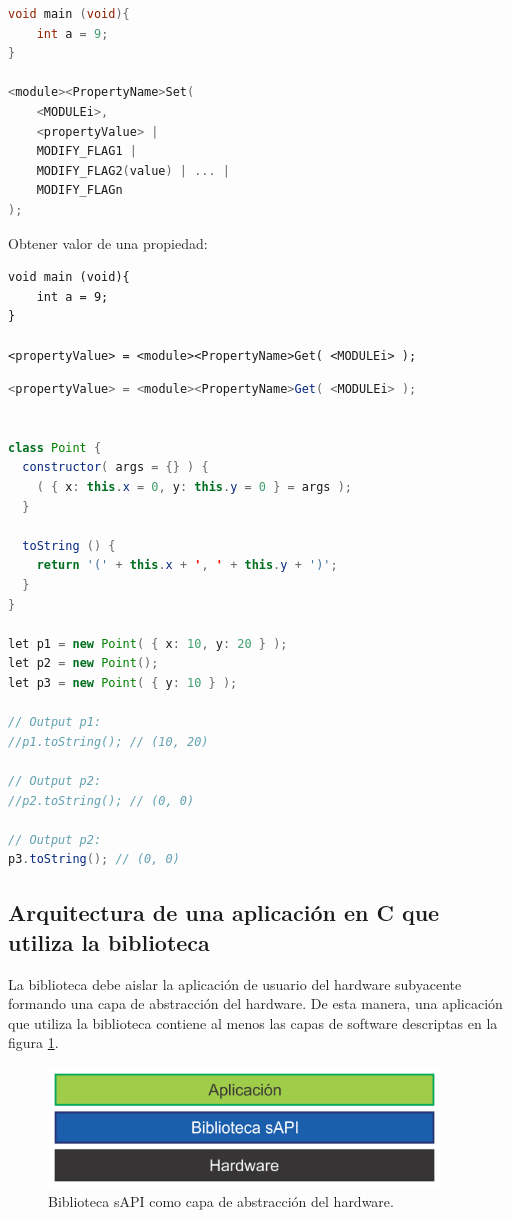 \begin{lstlisting}[language=C]
void main (void){
	int a = 9;
}

<module><PropertyName>Set(
    <MODULEi>,
    <propertyValue> |
    MODIFY_FLAG1 |
    MODIFY_FLAG2(value) | ... | 
    MODIFY_FLAGn
);
\end{lstlisting}

Obtener valor de una propiedad: 


\begin{lstlisting}
void main (void){
	int a = 9;
}

<propertyValue> = <module><PropertyName>Get( <MODULEi> );
\end{lstlisting}


\begin{lstlisting}[language=Java]
<propertyValue> = <module><PropertyName>Get( <MODULEi> );


class Point {
  constructor( args = {} ) {
    ( { x: this.x = 0, y: this.y = 0 } = args );
  }

  toString () {
    return '(' + this.x + ', ' + this.y + ')';
  }
}

let p1 = new Point( { x: 10, y: 20 } );
let p2 = new Point();
let p3 = new Point( { y: 10 } );

// Output p1:
//p1.toString(); // (10, 20)

// Output p2:
//p2.toString(); // (0, 0)

// Output p2:
p3.toString(); // (0, 0)
\end{lstlisting}




\subsection{Arquitectura de una aplicación en C que utiliza la biblioteca}

La biblioteca debe aislar la aplicación de usuario del hardware subyacente formando una capa de abstracción del hardware. De esta manera, una aplicación que utiliza la biblioteca contiene al menos las capas de software descriptas en la figura \ref{fig:sapiCapas1}.

\begin{figure}[!htbp]
\begin{center}  %
\includegraphics*[width=10.4cm]{Figures/sapiCapas1.png}
\par\caption{Biblioteca sAPI como capa de abstracción del hardware.}\label{fig:sapiCapas1}
\end{center}
\end{figure}

